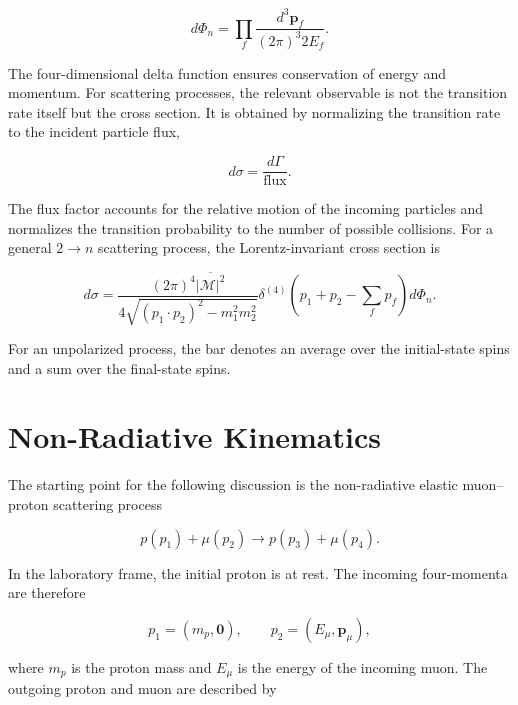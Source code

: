 \begin{equation}
    d\Phi_n
    =
    \prod_f
    \frac{d^3\mathbf{p}_f}{(2\pi)^3 2E_f}.
\end{equation}

The four-dimensional delta function ensures conservation of energy and momentum. For scattering processes, the relevant observable is not the transition rate itself but the cross section. It is obtained by normalizing the transition rate to the incident particle flux,

\begin{equation}
    d\sigma
    =
    \frac{d\Gamma}{\text{flux}}.
\end{equation}

The flux factor accounts for the relative motion of the incoming particles and normalizes the transition probability to the number of possible collisions. For a general \(2\rightarrow n\) scattering process, the Lorentz-invariant cross section is

\begin{equation}
    d\sigma
    =
    \frac{(2\pi)^4\overline{|\mathcal{M}|^2}}
    {4\sqrt{(p_1\cdot p_2)^2-m_1^2m_2^2}}
    \delta^{(4)}
    \left(
        p_1+p_2-\sum_f p_f
    \right)
    d\Phi_n .
\end{equation}

For an unpolarized process, the bar denotes an average over the initial-state spins and a sum over the final-state spins.


\section{Non-Radiative Kinematics}

The starting point for the following discussion is the non-radiative elastic muon--proton scattering process

\begin{equation}
    p(p_1)+\mu(p_2)\rightarrow p(p_3)+\mu(p_4).
\end{equation}

In the laboratory frame, the initial proton is at rest. The incoming four-momenta are therefore

\begin{equation}
    p_1=(m_p,\mathbf{0}),
    \qquad
    p_2=(E_\mu,\mathbf{p}_\mu),
\end{equation}

where \(m_p\) is the proton mass and \(E_\mu\) is the energy of the incoming muon. The outgoing proton and muon are described by

